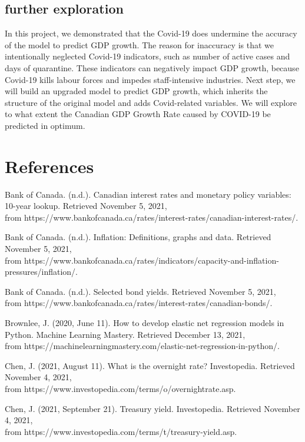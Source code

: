 \documentclass{article}
\begin{document}
\subsection{further exploration}
In this project, we demonstrated that the Covid-19 does undermine the accuracy of the model to predict GDP growth. The reason for inaccuracy is that we intentionally neglected Covid-19 indicators, such as number of active cases and days of quarantine. These indicators can negatively impact GDP growth, because Covid-19 kills labour forces and impedes staff-intensive industries. Next step, we will build an upgraded model to predict GDP growth, which inherits the structure of the original model and adds Covid-related variables. We will explore to what extent the Canadian GDP Growth Rate caused by COVID-19 be predicted in optimum.


\section*{References} 
Bank of Canada. (n.d.). Canadian interest rates and monetary policy variables: 10-year lookup. Retrieved November 5, 2021,\\ from https://www.bankofcanada.ca/rates/interest-rates/canadian-interest-rates/.

Bank of Canada. (n.d.). Inflation: Definitions, graphs and data. Retrieved November 5, 2021,\\ from https://www.bankofcanada.ca/rates/indicators/capacity-and-inflation-pressures/inflation/.

Bank of Canada. (n.d.). Selected bond yields. Retrieved November 5, 2021,\\ from https://www.bankofcanada.ca/rates/interest-rates/canadian-bonds/.

Brownlee, J. (2020, June 11). How to develop elastic net regression models in Python. Machine Learning Mastery. Retrieved December 13, 2021,\\ from https://machinelearningmastery.com/elastic-net-regression-in-python/. 

Chen, J. (2021, August 11). What is the overnight rate? Investopedia. Retrieved November 4, 2021,\\ from https://www.investopedia.com/terms/o/overnightrate.asp. 

Chen, J. (2021, September 21). Treasury yield. Investopedia. Retrieved November 4, 2021,\\ from https://www.investopedia.com/terms/t/treasury-yield.asp. 
\end{document}
